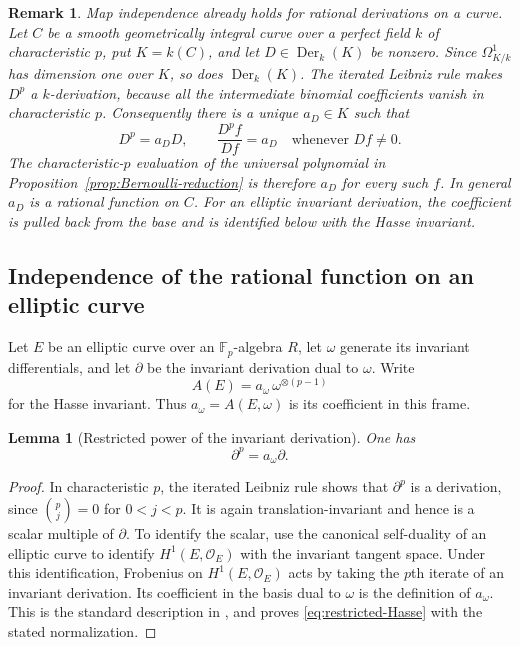 \documentclass[10pt,a4paper]{amsart}
\newtheorem{lem}[thm]{Lemma}
\newtheorem{remark}[thm]{Remark}
\numberwithin{equation}{section}
\begin{document}
\begin{remark}\label{rem:one-dimensional-reduction}
Map independence already holds for rational derivations on a curve.
Let $C$ be a smooth geometrically integral curve over a perfect field
$k$ of characteristic $p$, put $K=k(C)$, and let
$D\in\operatorname{Der}_k(K)$ be nonzero. Since
$\Omega^1_{K/k}$ has dimension one over $K$, so does
$\operatorname{Der}_k(K)$. The iterated Leibniz rule makes $D^p$ a
$k$-derivation, because all the intermediate binomial coefficients
vanish in characteristic $p$. Consequently there is a unique
$a_D\in K$ such that
\[
D^p=a_DD,\qquad \frac{D^pf}{Df}=a_D\quad\text{whenever }Df\neq0.
\]
The characteristic-$p$ evaluation of the universal polynomial in
Proposition~\ref{prop:Bernoulli-reduction} is therefore $a_D$ for
every such $f$. In general $a_D$ is a rational function on $C$.
For an elliptic invariant derivation, the coefficient is pulled back
from the base and is identified below with the Hasse invariant.
\end{remark}

\subsection{Independence of the rational function on an elliptic curve}

Let $E$ be an elliptic curve over an $\mathbb F_p$-algebra $R$, let
$\omega$ generate its invariant differentials, and let $\partial$ be
the invariant derivation dual to $\omega$. Write
\[
A(E)=a_\omega\,\omega^{\otimes(p-1)}
\]
for the Hasse invariant. Thus $a_\omega=A(E,\omega)$ is its coefficient
in this frame.

\begin{lem}[Restricted power of the invariant derivation]
\label{lem:restricted-Hasse}
One has
\begin{equation}\label{eq:restricted-Hasse}
\partial^p=a_\omega\partial.
\end{equation}
\end{lem}

\begin{proof}
In characteristic $p$, the iterated Leibniz rule shows that $\partial^p$
is a derivation, since $\binom pj=0$ for $0<j<p$. It is again
translation-invariant and hence is a scalar multiple of $\partial$.
To identify the scalar, use the canonical self-duality of an elliptic
curve to identify $H^1(E,\mathcal O_E)$ with the invariant tangent
space. Under this identification, Frobenius on $H^1(E,\mathcal O_E)$
acts by taking the $p$th iterate of an invariant derivation. Its
coefficient in the basis dual to $\omega$ is the definition of
$a_\omega$. This is the standard description in
\cite[\S2.0, pp.~97--98]{katz}, and proves
\eqref{eq:restricted-Hasse} with the stated normalization.
\end{proof}
\end{document}
